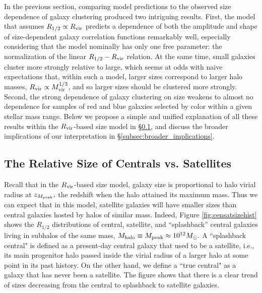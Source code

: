 \documentclass[usenatbib,usegraphicx,letterpaper]{mn2e}
\newcommand{\rhalf}{R_{1/2}}
\newcommand{\mvir}{M_{\rm vir}}
\newcommand{\mpeak}{M_{\rm peak}}
\newcommand{\zpeak}{z_{M_{\rm peak}}}
\newcommand{\mhalo}{M_{\rm halo}}
\newcommand{\rvir}{R_{\rm vir}}
\newcommand{\msun}{M_\odot}
\begin{document}
In the previous section, comparing model predictions to the observed size dependence of galaxy clustering produced two intriguing results. First, the model that assumes $\rhalf\propto\rvir$ predicts a dependence of both the amplitude and shape of  size-dependent galaxy correlation functions remarkably well, especially considering that the model nominally has only one free parameter: the normalization of the linear $\rhalf-\rvir$ relation. At the same time, small galaxies cluster more strongly relative to large, which seems at odds with naive expectations that, within such a model, larger sizes correspond to larger halo masses, $\rvir\propto\mvir^{1/3}$, and so larger sizes should be clustered more strongly. Second, the strong dependence of galaxy clustering on size weakens to almost no dependence for samples of red and blue galaxies selected by color within a given stellar mass range.
Below we propose a simple and unified explanation of all these results within the $\rvir$-based size model in \S\ref{subsec:censat_sizes}, and discuss the broader implications of our interpretation in \S\ref{subsec:broader_implications}.

\subsection{The Relative Size of Centrals vs. Satellites}
\label{subsec:censat_sizes}

Recall that in the $\rvir$-based size model, galaxy size is proportional to halo virial radius at $\zpeak,$ the redshift when the halo attained its maximum mass. Thus we can expect that in this model, satellite galaxies will have smaller sizes than  central galaxies hosted by halos of similar mass.  Indeed, Figure \ref{fig:censatsizehist} shows the $\rhalf$ distributions of central, satellite, and ``splashback'' central galaxies living in subhalos of the same mass, $\mhalo\equiv\mpeak\approx10^{12}\msun.$ A ``splashback central"  is defined as a present-day central galaxy that used to be a satellite, i.e., its main progenitor halo passed inside the virial radius of a larger halo at some point in its past history. On the other hand, we define a ``true central" as a galaxy that has never been a satellite. The figure shows that there is a clear trend of sizes decreasing from the central to splashback to satellite galaxies.
\end{document}
